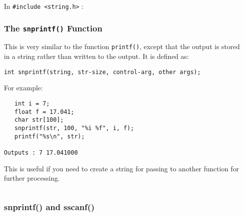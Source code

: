 
\begin{frame}[fragile]
\begin{columns}

\begin{column}{0.45\textwidth}
In \verb^#include <string.h>^ :
\frametitle{The {\tt snprintf()} Function}
This is very similar to the function \verb^printf()^, except
that the output is stored in a string rather than written
to the output.
It is defined as:
\vspace{-0.75em}
{\small
\begin{verbatim}
int snprintf(string, str-size, control-arg, other args);
\end{verbatim}
}
\vspace{-0.75em}
For example:
\vspace{-0.75em}
\begin{verbatim}
   int i = 7;
   float f = 17.041;
   char str[100];
   snprintf(str, 100, "%i %f", i, f);
   printf("%s\n", str);

Outputs : 7 17.041000
\end{verbatim}
\vspace{-0.75em}
This is useful if you need to create a string for passing
to another function for further processing.
\end{column}

\pause
\begin{column}{0.45\textwidth}

\end{column}

\end{columns}
\end{frame}


\begin{frame}[fragile]
\frametitle{snprintf() and sscanf()}
\begin{columns}

\begin{column}{0.45\textwidth}

\end{column}

\pause
\begin{column}{0.45\textwidth}

\end{column}

\end{columns}
\end{frame}
